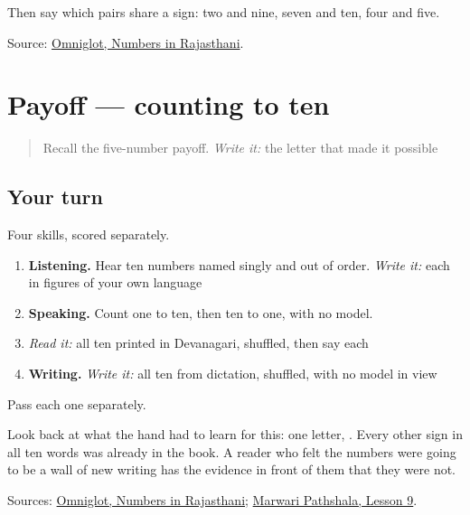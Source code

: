 Then say which pairs share a sign: two and nine, seven and ten, four and five.

\begin{tcolorbox}[breakable,colback=teal!4,colframe=teal!35!black,title={Before you move on}]
Source: \href{https://www.omniglot.com/language/numbers/rajasthani.htm}{Omniglot, Numbers in Rajasthani}.
\end{tcolorbox}
\section[Practice]{Payoff — counting to ten}

\label{lesson:MW-C33-count-ten}



\begin{quote}
Recall the five-number payoff. \emph{Write it:} the letter that made it possible
\end{quote}

\subsection*{Your turn}
Four skills, scored separately.

\begin{enumerate}
\raggedright
  \item \textbf{Listening.} Hear ten numbers named singly and out of order. \emph{Write it:} each in figures of your own language
  \item \textbf{Speaking.} Count one to ten, then ten to one, with no model.
  \item \emph{Read it:} all ten printed in Devanagari, shuffled, then say each
  \item \textbf{Writing.} \emph{Write it:} all ten from dictation, shuffled, with no model in view
\end{enumerate}

Pass each one separately.

Look back at what the hand had to learn for this: one letter, \textbf{}. Every other sign in all ten words was already in the book. A reader who felt the numbers were going to be a wall of new writing has the evidence in front of them that they were not.

\begin{tcolorbox}[breakable,colback=teal!4,colframe=teal!35!black,title={Before you move on}]
Sources: \href{https://www.omniglot.com/language/numbers/rajasthani.htm}{Omniglot, Numbers in Rajasthani}; \href{https://www.marwaripathshala.com/marwari-lesson-9-english}{Marwari Pathshala, Lesson 9}.
\end{tcolorbox}
